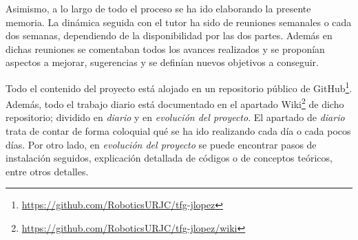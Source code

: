 Asimismo, a lo largo de todo el proceso se ha ido elaborando la presente memoria. La dinámica seguida con el tutor ha sido de reuniones semanales o cada dos semanas, dependiendo de la disponibilidad por las dos partes. Además en dichas reuniones se comentaban todos los avances realizados y se proponían aspectos a mejorar, sugerencias y se definían nuevos objetivos a conseguir. 

Todo el contenido del proyecto está alojado en un repositorio público de GitHub\footnote{\url{https://github.com/RoboticsURJC/tfg-jlopez}}. Además, todo el trabajo diario está documentado en el apartado Wiki\footnote{\url{https://github.com/RoboticsURJC/tfg-jlopez/wiki}} de dicho repositorio; dividido en \textit{diario} y en \textit{evolución del proyecto}. El apartado de \textit{diario} trata de contar de forma coloquial qué se ha ido realizando cada día o cada pocos días. Por otro lado, en \textit{evolución del proyecto} se puede encontrar pasos de instalación seguidos, explicación detallada de códigos o de conceptos teóricos, entre otros detalles.





